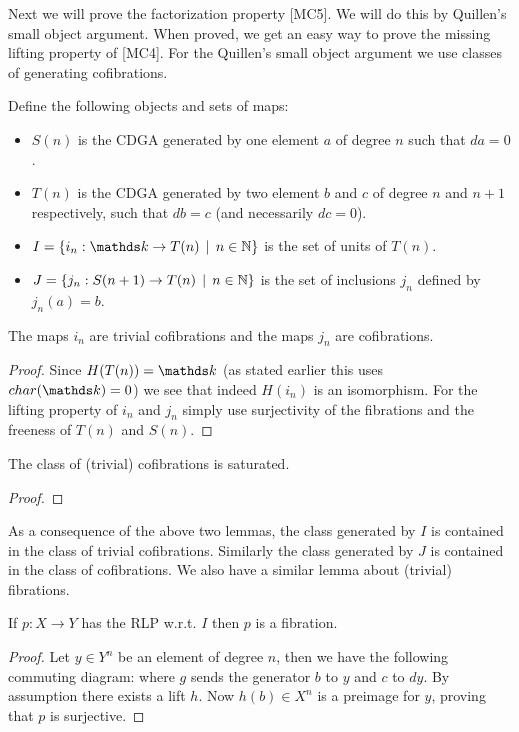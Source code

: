 Next we will prove the factorization property [MC5]. We will do this by Quillen's small object argument. When proved, we get an easy way to prove the missing lifting property of [MC4]. For the Quillen's small object argument we use classes of generating cofibrations.

\begin{definition}
	Define the following objects and sets of maps:
	\begin{itemize}
		\item $S(n)$ is the CDGA generated by one element $a$ of degree $n$ such that $da = 0$.
		\item $T(n)$ is the CDGA generated by two element $b$ and $c$ of degree $n$ and $n+1$ respectively, such that $db = c$ (and necessarily $dc = 0$).
		\item $I = \{ i_n: \k \to T(n) \I n \in \N \}$ is the set of units of $T(n)$.
		\item $J = \{ j_n: S(n+1) \to T(n) \,\mid\, n \in \mathbb{N} \}$ is the set of inclusions $j_n$ defined by $j_n(a) = b$.
	\end{itemize}
\end{definition}

\begin{lemma}
	The maps $i_n$ are trivial cofibrations and the maps $j_n$ are cofibrations.
\end{lemma}
\begin{proof}
	Since $H(T(n)) = \k$ (as stated earlier this uses $\Char{\k} = 0$) we see that indeed $H(i_n)$ is an isomorphism. For the lifting property of $i_n$ and $j_n$ simply use surjectivity of the fibrations and the freeness of $T(n)$ and $S(n)$. 
\end{proof}

\begin{lemma}
	The class of (trivial) cofibrations is saturated.
\end{lemma}
\begin{proof}
\end{proof}

As a consequence of the above two lemmas, the class generated by $I$ is contained in the class of trivial cofibrations. Similarly the class generated by $J$ is contained in the class of cofibrations. We also have a similar lemma about (trivial) fibrations.

\begin{lemma}
	If $p: X \to Y$ has the RLP w.r.t. $I$ then $p$ is a fibration.
\end{lemma}
\begin{proof}
	Let $y \in Y^n$ be an element of degree $n$, then we have the following commuting diagram:
	where $g$ sends the generator $b$ to $y$ and $c$ to $dy$. By assumption there exists a lift $h$. Now $h(b) \in X^n$ is a preimage for $y$, proving that $p$ is surjective.
\end{proof}

